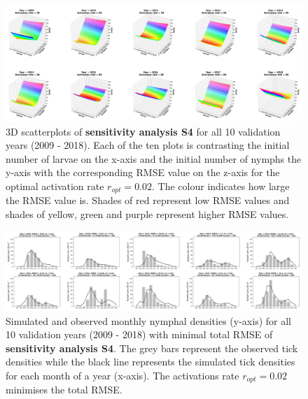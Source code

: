 \documentclass[a4paper, 11pt]{scrartcl}
\begin{document}
\begin{figure}
\centering
\includegraphics[width=\linewidth]{figures/independent_initial_ticks_without_beech_error.png}
\caption{3D scatterplots of \textbf{sensitivity analysis S4} for all 10 validation years (2009 - 2018). Each of the ten plots is contrasting the initial number of larvae on the
x-axis and the initial number of nymphs the y-axis with the corresponding RMSE value on the z-axis for the optimal activation rate $r_{opt} = 0.02$. The colour indicates how large
the RMSE value is. Shades of red represent low RMSE values and shades of yellow, green and purple represent higher RMSE values.}
\label{fig:independent_initial_ticks_without_beech_error_rotated}
\end{figure}

\begin{figure}
\centering
\includegraphics[width=\linewidth]{figures/independent_initial_ticks_without_beech.png}
\caption{Simulated and observed monthly nymphal densities (y-axis) for all 10 validation years (2009 - 2018) with minimal total RMSE of \textbf{sensitivity analysis S4}. The
grey bars represent the observed tick densities while the black line represents the simulated tick densities for each month of a year (x-axis). The activations rate
$r_{opt}= 0.02$ minimises the total RMSE.}
\label{fig:independent_initial_ticks_without_beech_rotated}
\end{figure}
\end{document}
